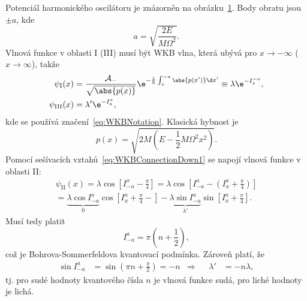 \begin{solution}
	\begin{figure}[!htbp]
	\centering
	\label{fig:WKBHarmonicOscillator}
	\end{figure}	
		
	Potenciál harmonického oscilátoru je znázorněn na obrázku~\ref{fig:WKBHarmonicOscillator}.
	Body obratu jsou $\pm a$, kde
	\begin{equation}
		a=\sqrt{\frac{2E}{M\Omega^{2}}}.
	\end{equation}
	Vlnová funkce v oblasti I (III) musí být WKB vlna, která ubývá pro $x\rightarrow-\infty$ ($x\rightarrow\infty$), takže
	\begin{subequations}
		\begin{align}
			\psi_{\mathrm{I}}(x)&=\frac{\mathcal{A}_{-}}{\sqrt{\abs{p(x)}}}\e^{-\frac{1}{\hbar}\int_{x}^{-a}\abs{p(x')}\d x'}\equiv\lambda\e^{-I_{x}^{-a}},\\
			\psi_{\mathrm{III}}(x)&=\lambda'\e^{-I_{a}^{x}},
		\end{align}				
	\end{subequations}
	kde se používá značení~\eqref{eq:WKBNotation}.
	Klasická hybnost je
	\begin{equation}
		p(x)=\sqrt{2M\left(E-\frac{1}{2}M\Omega^{2}x^{2}\right)}.
	\end{equation}	
	Pomocí sešívacích vztahů~\eqref{eq:WKBConnectionDown1} se napojí vlnová funkce v oblasti II:
	\begin{align}
		\psi_{\mathrm{II}}(x)
			=\lambda\cos{\left[I_{-a}^{x}-\frac{\pi}{4}\right]}
			=\lambda\cos{\left[I_{-a}^{a}-\left(I_{x}^{a}+\frac{\pi}{4}\right)\right]}\nonumber\\
			=\underbrace{\lambda\cos{I_{-a}^{a}}}_{0}\cos{\left[I_{x}^{a}+\frac{\pi}{4}-\right]}-\underbrace{\lambda\sin{I_{-a}^{a}}}_{\lambda'}\sin{\left[I_{x}^{a}+\frac{\pi}{4}\right]}.
	\end{align}
	Musí tedy platit
	\begin{equation}
		\label{eq:WKBHarmonicOscillatorBS}
		I_{-a}^{a}=\pi\left(n+\frac{1}{2}\right),
	\end{equation}
	což je Bohrova-Sommerfeldova kvantovací podmínka.
	Zároveň platí, že
	\begin{align}
		\sin{I_{-a}^{a}}&=\sin\left(\pi n+\frac{\pi}{2}\right)=\minus{n}&\Longrightarrow&&\lambda'&=\minus{n}\lambda,
	\end{align}
	tj. pro sudé hodnoty kvantového čísla $n$ je vlnová funkce sudá, pro liché hodnoty je lichá.


\end{solution}
